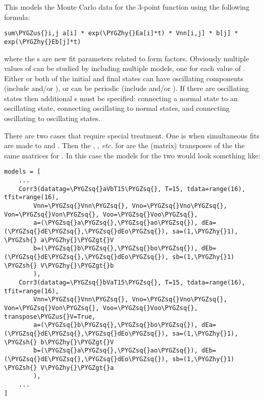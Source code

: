 \documentclass[letterpaper,10pt,english]{sphinxmanual}
\def\PYGZus{\char`\_}
\def\PYGZgt{\char`\>}
\def\PYGZsh{\char`\#}
\def\PYGZhy{\char`\-}
\def\PYGZsq{\char`\'}
\begin{document}
This models the Monte Carlo data for the 3-point function using the
following formula:

\begin{Verbatim}[commandchars=\\\{\}]
sum\PYGZus{}i,j a[i] * exp(\PYGZhy{}Ea[i]*t) * Vnn[i,j] * b[j] * exp(\PYGZhy{}Eb[j]*t)
\end{Verbatim}

where the s are new fit parameters related to  form
factors. Obviously multiple values of  can be studied by including
multiple {\hyperref[corrfitter:corrfitter.Corr3]{}} models, one for each value of . Either or both of the
initial and final states can have oscillating components (include 
and/or ), or can be periodic (include  and/or ). If
there are oscillating states then additional s must be specified:
 connecting a normal state to an oscillating state, 
connecting oscillating to normal states, and  connecting oscillating
to oscillating states.

There are two cases that require special treatment. One is when
simultaneous fits are made to  and . Then the
, , \emph{etc.} for  are the (matrix) transposes of
the the same matrices for . In this case the models for the two
would look something like:

\begin{Verbatim}[commandchars=\\\{\}]
models = [
    ...
    Corr3(datatag=\PYGZsq{}aVbT15\PYGZsq{}, T=15, tdata=range(16), tfit=range(16),
        Vnn=\PYGZsq{}Vnn\PYGZsq{}, Vno=\PYGZsq{}Vno\PYGZsq{}, Von=\PYGZsq{}Von\PYGZsq{}, Voo=\PYGZsq{}Voo\PYGZsq{},
        a=(\PYGZsq{}a\PYGZsq{},\PYGZsq{}ao\PYGZsq{}), dEa=(\PYGZsq{}dE\PYGZsq{},\PYGZsq{}dEo\PYGZsq{}), sa=(1,\PYGZhy{}1), \PYGZsh{} a\PYGZhy{}\PYGZgt{}V
        b=(\PYGZsq{}b\PYGZsq{},\PYGZsq{}bo\PYGZsq{}), dEb=(\PYGZsq{}dE\PYGZsq{},\PYGZsq{}dEo\PYGZsq{}), sb=(1,\PYGZhy{}1)  \PYGZsh{} V\PYGZhy{}\PYGZgt{}b
        ),
    Corr3(datatag=\PYGZsq{}bVaT15\PYGZsq{}, T=15, tdata=range(16), tfit=range(16),
        Vnn=\PYGZsq{}Vnn\PYGZsq{}, Vno=\PYGZsq{}Vno\PYGZsq{}, Von=\PYGZsq{}Von\PYGZsq{}, Voo=\PYGZsq{}Voo\PYGZsq{}, transpose\PYGZus{}V=True,
        a=(\PYGZsq{}b\PYGZsq{},\PYGZsq{}bo\PYGZsq{}), dEa=(\PYGZsq{}dE\PYGZsq{},\PYGZsq{}dEo\PYGZsq{}), sa=(1,\PYGZhy{}1), \PYGZsh{} b\PYGZhy{}\PYGZgt{}V
        b=(\PYGZsq{}a\PYGZsq{},\PYGZsq{}ao\PYGZsq{}), dEb=(\PYGZsq{}dE\PYGZsq{},\PYGZsq{}dEo\PYGZsq{}), sb=(1,\PYGZhy{}1)  \PYGZsh{} V\PYGZhy{}\PYGZgt{}a
        ),
    ...
]
\end{Verbatim}
\end{document}
